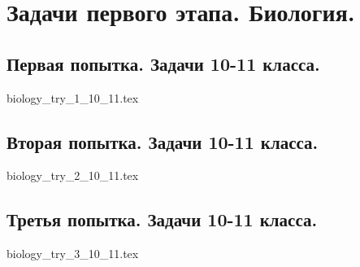 \chapter{Задачи первого этапа. Биология.}

\section{Первая попытка. Задачи 10-11 класса.}

{biology_try_1_10_11.tex}

\section{Вторая попытка. Задачи 10-11 класса.}

{biology_try_2_10_11.tex}

\section{Третья попытка. Задачи 10-11 класса.}

{biology_try_3_10_11.tex}
